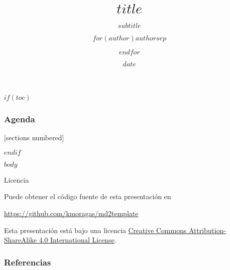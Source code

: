 \documentclass[10pt]{beamer}
\title{$title$}
\subtitle{$subtitle$}
\author{$for(author)$$author$$sep$ \and $endfor$}
\date{$date$}
\institute{$institute$}
\begin{document}
\maketitle

$if(toc)$

\begin{frame}
  \frametitle{Agenda}
  [sections numbered]
  \tableofcontents[hideallsubsections]
\end{frame}

$endif$


$body$



\begin{frame}{Licencia}

  Puede obtener el código fuente de esta presentación en

  \begin{center}\url{https://github.com/kmoragas/md2template}\end{center}

  Esta presentación está bajo una licencia 
  \href{http://creativecommons.org/licenses/by-sa/4.0/}{Creative Commons
  Attribution-ShareAlike 4.0 International License}.

  \begin{center}\ccbysa\end{center}

\end{frame}

\begin{frame}[allowframebreaks]

  \frametitle{Referencias}

  
  

\end{frame}
\end{document}
